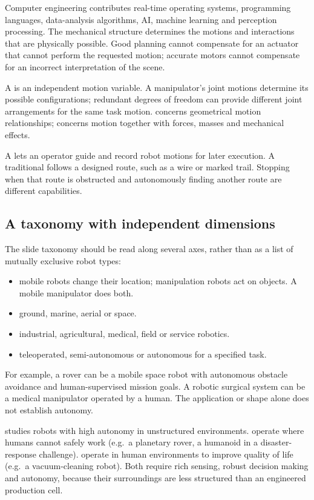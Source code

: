 Computer engineering contributes real-time operating systems, programming languages, data-analysis algorithms, AI, machine learning and perception processing. The mechanical structure determines the motions and interactions that are physically possible. Good planning cannot compensate for an actuator that cannot perform the requested motion; accurate motors cannot compensate for an incorrect interpretation of the scene.

A  is an independent motion variable. A manipulator's joint motions determine its possible configurations; redundant degrees of freedom can provide different joint arrangements for the same task motion.  concerns geometrical motion relationships;  concerns motion together with forces, masses and mechanical effects.

A  lets an operator guide and record robot motions for later execution. A traditional  follows a designed route, such as a wire or marked trail. Stopping when that route is obstructed and autonomously finding another route are different capabilities.

\subsection{A taxonomy with independent dimensions}
The slide taxonomy should be read along several axes, rather than as a list of mutually exclusive robot types:
\begin{itemize}
\item {} mobile robots change their location; manipulation robots act on objects. A mobile manipulator does both.
\item {} ground, marine, aerial or space.
\item {} industrial, agricultural, medical, field or service robotics.
\item {} teleoperated, semi-autonomous or autonomous for a specified task.
\end{itemize}
For example, a rover can be a mobile space robot with autonomous obstacle avoidance and human-supervised mission goals. A robotic surgical system can be a medical manipulator operated by a human. The application or shape alone does not establish autonomy.

 studies robots with high autonomy in unstructured environments.  operate where humans cannot safely work (e.g.\ a planetary rover, a humanoid in a disaster-response challenge).  operate in human environments to improve quality of life (e.g.\ a vacuum-cleaning robot). Both require rich sensing, robust decision making and autonomy, because their surroundings are less structured than an engineered production cell.

